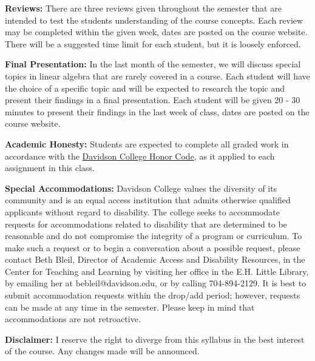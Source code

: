 \documentclass[11pt, a4paper]{article}
\begin{document}
\vspace*{0.5em}
\noindent\textbf{Reviews:}
There are three reviews given throughout the semester that are intended to test the students understanding of the course concepts. Each review may be completed within the given week, dates are posted on the course website. There will be a suggested time limit for each student, but it is loosely enforced. 

\vspace*{0.5em}
\noindent\textbf{Final Presentation:}
In the last month of the semester, we will discuss special topics in linear algebra that are rarely covered in a course. Each student will have the choice of a specific topic and will be expected to research the topic and present their findings in a final presentation. Each student will be given 20 - 30 minutes to present their findings in the last week of class, dates are posted on the course website. 

\vspace*{0.5em}
\noindent\textbf{Academic Honesty:} 
Students are expected to complete all graded work in accordance
with the \href{http://www.davidson.edu/about/distinctly-davidson/honor-code}{Davidson College Honor Code}, as it applied to each assignment in this class. 

\vspace*{.15in}
\noindent\textbf{Special Accommodations:}
Davidson College values the diversity of its community and is an equal access institution that admits otherwise qualified applicants without regard to disability.  The college seeks to accommodate requests for accommodations related to disability that are determined to be reasonable and do not compromise the integrity of a program or curriculum. To make such a request or to begin a conversation about a possible request, please contact Beth Bleil, Director of Academic Access and Disability Resources, in the Center for Teaching and Learning by visiting her office in the E.H. Little Library, by emailing her at bebleil@davidson.edu, or by calling 704-894-2129.  It is best to submit accommodation requests within the drop/add period; however, requests can be made at any time in the semester.  Please keep in mind that accommodations are not retroactive.

\vspace*{.15in}
\noindent\textbf{Disclaimer:}
I reserve the right to diverge from this syllabus in the best interest of the course. Any changes made will be announced. 
\end{document}

